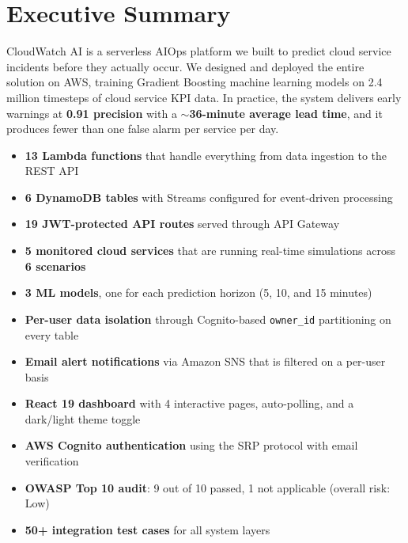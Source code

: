 \documentclass[11pt,a4paper]{article}
\begin{document}
\tableofcontents
\newpage

\section{Executive Summary}

CloudWatch AI is a serverless AIOps platform we built to predict cloud service incidents before they actually occur. We designed and deployed the entire solution on AWS, training Gradient Boosting machine learning models on 2.4 million timesteps of cloud service KPI data. In practice, the system delivers early warnings at \textbf{0.91 precision} with a \textbf{$\sim$36-minute average lead time}, and it produces fewer than one false alarm per service per day.

\begin{infobox}
\begin{itemize}[leftmargin=1em, itemsep=2pt]
    \item \textbf{13 Lambda functions} that handle everything from data ingestion to the REST API
    \item \textbf{6 DynamoDB tables} with Streams configured for event-driven processing
    \item \textbf{19 JWT-protected API routes} served through API Gateway
    \item \textbf{5 monitored cloud services} that are running real-time simulations across \textbf{6 scenarios}
    \item \textbf{3 ML models}, one for each prediction horizon (5, 10, and 15 minutes)
    \item \textbf{Per-user data isolation} through Cognito-based \texttt{owner\_id} partitioning on every table
    \item \textbf{Email alert notifications} via Amazon SNS that is filtered on a per-user basis
    \item \textbf{React 19 dashboard} with 4 interactive pages, auto-polling, and a dark/light theme toggle
    \item \textbf{AWS Cognito authentication} using the SRP protocol with email verification
    \item \textbf{OWASP Top 10 audit}: 9 out of 10 passed, 1 not applicable (overall risk: Low)
    \item \textbf{50+ integration test cases} for all system layers
\end{itemize}
\end{infobox}
\end{document}

